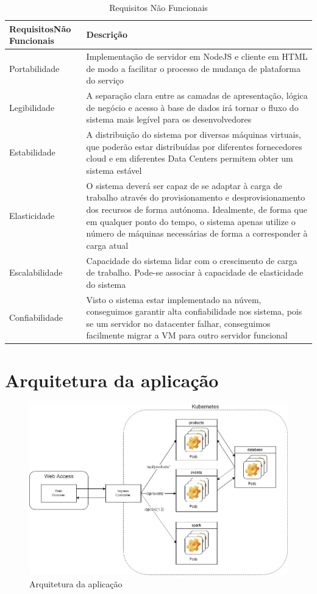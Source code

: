 \documentclass[11pt,a4paper]{article}
\begin{document}
\begin{table}[H]
	\begin{center}
		\begin{tabular}{|p{3.5cm}|p{8.5cm}|}
		\hline
			\textbf{Requisitos\newline Não Funcionais} & \textbf{Descrição}\\ \hline
			Portabilidade & Implementação de servidor em NodeJS e cliente em HTML de modo a facilitar o processo de mudança de plataforma do serviço \\ \hline
			Legibilidade & A separação clara entre as camadas de apresentação, lógica de negócio e acesso à base de dados irá tornar o fluxo do sistema mais legível para os desenvolvedores \\ \hline
			Estabilidade & A distribuição do sistema por diversas máquinas virtuais, que poderão estar distribuídas por diferentes fornecedores cloud e em diferentes Data Centers permitem obter um sistema estável \\ \hline
			Elasticidade & O sistema deverá ser capaz de se adaptar à carga de trabalho através do provisionamento e desprovisionamento dos recursos de forma autónoma. Idealmente, de forma que em qualquer ponto do tempo, o sistema apenas utilize o número de máquinas necessárias de forma a corresponder à carga atual \\ \hline
			Escalabilidade & Capacidade do sistema lidar com o crescimento de carga de trabalho. Pode-se associar à capacidade de elasticidade do sistema \\ \hline
			Confiabilidade & Visto o sistema estar implementado na núvem, conseguimos garantir alta confiabilidade nos sistema, pois se um servidor no datacenter falhar, conseguimos facilmente migrar a VM para outro servidor funcional \\ \hline
	\end{tabular}
	\label{tab1}
	\end{center}
	\caption{Requisitos Não Funcionais}
\end{table}

\section{Arquitetura da aplicação}
\begin{figure}[H]
  \centering
  \includegraphics[scale=0.4]{App_arc.png}
  \caption{Arquitetura da aplicação}
\end{figure}
\end{document}

